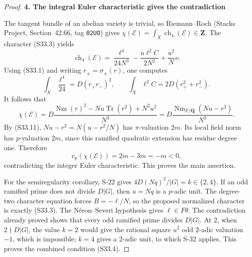 \documentclass[11pt,a4paper]{article}
\theoremstyle{definition}
\begin{document}
\begin{proof}
\par\medskip\noindent\textbf{4. The integral Euler characteristic gives the contradiction}\quad 

The tangent bundle of an abelian variety is trivial, so Riemann--Roch (Stacks Project, Section~42.66, tag \texttt{02UO}) gives \(\chi(\mathcal E)=\int_X\operatorname{ch}_4(\mathcal E)\in\mathbf Z\). The character (S33.3) yields \[
 \operatorname{ch}_4(\mathcal E)
 =\frac{\ell^4}{24N^3}
       -\frac{u\ell^2C}{2N^2}+\frac{u^2}{N}\nu.
\] Using (S33.1) and writing \(r_\pm=\sigma_\pm(r)\), one computes \[
 \int_X\frac{\ell^4}{24}=D(r_+r_-)^2,
 \qquad
 \int_X\ell^2C=2D(r_+^2+r_-^2).
\] It follows that \[
 \chi(\mathcal E)
 =D\frac{\operatorname{Nm}(r)^2-Nu\operatorname{Tr}(r^2)+N^2u^2}{N^3}
 =D\frac{\operatorname{Nm}_{F/\mathbf Q}(Nu-r^2)}{N^3}.
 \tag{S33.12}
\] By (S33.11), \(Nu-r^2=N(u-r^2/N)\) has \(\pi\)-valuation \(2m\). Its local field norm has \(p\)-valuation \(2m\), since this ramified quadratic extension has residue degree one. Therefore \[
 v_p(\chi(\mathcal E))=2m-3m=-m<0,
 \tag{S33.13}
\] contradicting the integer Euler characteristic. This proves the main assertion.

For the semiregularity corollary, S-22 gives \(4D(Nq)^2/|G|=k\in\{2,4\}\). If an odd ramified prime does not divide \(D|G|\), then \(u=Nq\) is a \(p\)-adic unit. The degree-two character equation forces \(B=-\ell/N\), so the proposed normalized character is exactly (S33.3). The Néron--Severi hypothesis gives \(\ell\in F\theta\). The contradiction already proved shows that every odd ramified prime divides \(D|G|\). At \(2\), when \(2\nmid D|G|\), the value \(k=2\) would give the rational square \(u^2\) odd \(2\)-adic valuation \(-1\), which is impossible; \(k=4\) gives a \(2\)-adic unit, to which S-32 applies. This proves the combined condition (S33.4).
\end{proof}
\end{document}
